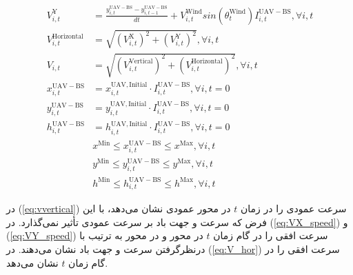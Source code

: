 \begin{align}
V_{i,t}^{\mathrm{Y}}&=\frac{y_{i,t}^ \mathrm{ \mathrm{ \mathrm{{UAV-BS}}}} - y_{i,t-1}^ \mathrm{ \mathrm{ \mathrm{{UAV-BS}}}}}{dt}+ V_{i,t}^\mathrm{{Wind}} sin(\theta _{t}^{\mathrm{Wind}})I_{i,t}^ \mathrm{{UAV-BS}},  \forall i,t \label{eq:VY_speed}\\
V_{i,t}^{\mathrm{Horizontal}}&= \sqrt{\left ( V_{i,t}^{\mathrm{X}} \right )^{2}+\left ( V_{i,t}^{\mathrm{Y}} \right )^{2}}, \forall i,t \label{eq:V_hor}\\
V_{i,t}&= \sqrt{\left ( V_{i,t}^\mathrm{{Vertical}} \right )^{2}+\left ( V_{i,t}^{\mathrm{Horizontal}} \right )^{2}},  \forall i,t \label{eq:V_total}\\
x_{i,t}^ \mathrm{ \mathrm{ \mathrm{{UAV-BS}}}}&= x_{i,t}^{\mathrm{UAV,Initial}} \cdot I_{i,t}^ \mathrm{{UAV-BS}} ,   \forall i,t=0 \label{eq:UAVinitiPos_x}\\
y_{i,t}^ \mathrm{ \mathrm{ \mathrm{{UAV-BS}}}}&= y_{i,t}^{\mathrm{UAV,Initial}} \cdot I_{i,t}^ \mathrm{ \mathrm{ \mathrm{{UAV-BS}}}},   \forall i,t=0 \label{eq:UAVinitiPos_y}\\
h_{i,t}^ \mathrm{ \mathrm{ \mathrm{{UAV-BS}}}}&= h_{i,t}^{\mathrm{UAV,Initial}}\cdot I_{i,t}^ \mathrm{ \mathrm{ \mathrm{{UAV-BS}}}},   \forall i,t=0 \label{eq:UAVinitiPos_h}\\
&x^{\mathrm{Min}}\leq x_{i,t}^ \mathrm{{UAV-BS}}\leq x^{\mathrm{Max}},  \forall i,t	 \label{eq:xlimit}\\
&y^{\mathrm{Min}}\leq y_{i,t}^ \mathrm{{UAV-BS}}\leq y^{\mathrm{Max}},  \forall i,t	 \label{eq:ylimit}\\
&h^{\mathrm{Min}}\leq h_{i,t}^ \mathrm{UAV-BS}\leq h^{\mathrm{Max}},  \forall i,t \label{eq:hlimit}
\end{align} 

در (\autoref{eq:vvertical}) سرعت عمودی  را در زمان $t$ در محور عمودی نشان می‌دهد، با این فرض که سرعت و جهت باد بر سرعت عمودی تأثیر نمی‌گذارد. در (\autoref{eq:VX_speed}) و (\autoref{eq:VY_speed}) سرعت افقی  را در گام زمان $t$ در محور  و در محور  به ترتیب با درنظرگرفتن سرعت و جهت باد نشان می‌دهند. در (\autoref{eq:V_hor}) سرعت افقی  را در گام زمان $t$ نشان می‌دهد.

